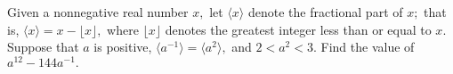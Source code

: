 Given a nonnegative real number $x,$ let $\langle x\rangle$ denote the fractional part of $x;$ that is, $\langle x\rangle=x-\lfloor x\rfloor,$ where $\lfloor x\rfloor$ denotes the greatest integer less than or equal to $x.$  Suppose that $a$ is positive, $\langle a^{-1}\rangle=\langle a^2\rangle,$ and $2<a^2<3.$  Find the value of $a^{12}-144a^{-1}.$